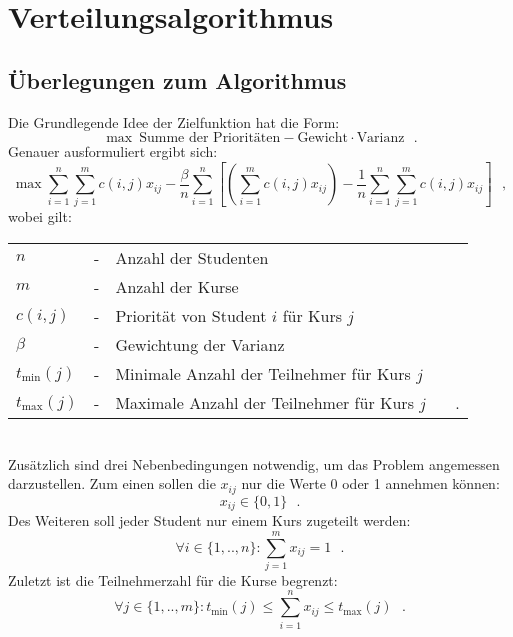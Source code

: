 \chapter{Verteilungsalgorithmus}
\label{chapter:algorithm}
    \section{Überlegungen zum Algorithmus}
            Die Grundlegende Idee der Zielfunktion hat die Form:
                $$ \max ~\text{Summe der Prioritäten} - \text{Gewicht} \cdot \text{Varianz} ~~~.$$
            Genauer ausformuliert ergibt sich:
                $$ \max 
                    \sum_{i=1}^{n} \sum_{j=1}^{m} c(i,j)x_{ij} 
                    - \frac{\beta}{n} \sum_{i=1}^{n}
                        \left[\left(\sum_{i=1}^{m} c(i,j)x_{ij}\right) - \frac{1}{n} \sum_{i=1}^{n} \sum_{j=1}^{m} c(i,j)x_{ij}\right] ~~~,$$
            wobei gilt:\\
                \begin{tabular}{l c l}
                    $n$ & - & Anzahl der Studenten \\
                    $m$ & - & Anzahl der Kurse\\
                    $ c(i,j) $ & - & Priorität von Student $ i $ für Kurs $ j $\\
                    $ \beta $ & - & Gewichtung der Varianz\\
                    $t_{\min}(j)$ & - & Minimale Anzahl der Teilnehmer für Kurs $ j $\\
                    $t_{\max}(j)$ & - & Maximale Anzahl der Teilnehmer für Kurs $ j $ ~~~.\\
                \end{tabular}\\
            
            Zusätzlich sind drei Nebenbedingungen notwendig, um das Problem angemessen darzustellen.
            Zum einen sollen die $ x_{ij} $ nur die Werte 0 oder 1 annehmen können:
                $$ x_{ij} \in \{0,1\} ~~~.$$
            Des Weiteren soll jeder Student nur einem Kurs zugeteilt werden:
                $$ \forall {i \in \{1,..,n\}}: \sum_{j=1}^{m} x_{ij} = 1 ~~~.$$
            Zuletzt ist die Teilnehmerzahl für die Kurse begrenzt:
                $$ \forall {j \in \{1,..,m\}}: t_{\min}(j) \leq \sum_{i=1}^{n} x_{ij} \leq t_{\max}(j) ~~~.$$